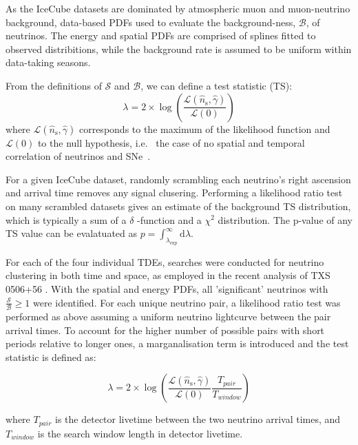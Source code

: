 \documentclass[twocolumn, tighten, linenumbers]{aastex62}
\begin{document}
As the IceCube datasets are dominated by atmospheric muon and muon-neutrino background, data-based PDFs used to evaluate the background-ness, $\mathcal{B}$,  of neutrinos. The energy and spatial PDFs are comprised of splines fitted to observed distribitions, while the background rate is assumed to be uniform within data-taking seasons.

From the definitions of $\mathcal{S}$ and $\mathcal{B}$, we can define a test statistic (TS):
\begin{equation*}
\lambda = 2\times \log \left( \frac{\mathcal{L}(\hat{n}_\text{s}, \hat{\gamma})}{\mathcal{L}(0)} \right)
\end{equation*}
where $\mathcal{L}(\hat{n}_\text{s}, \hat{\gamma})$ corresponds to the maximum of the likelihood function and $\mathcal{L}(0)$ to the null hypothesis, i.e.~ the case of no spatial and temporal correlation of neutrinos and SNe~\citep{Braun:2008bg,Braun:2009aa}. 

For a given IceCube dataset, randomly scrambling each neutrino's right ascension and arrival time removes any signal clusering. Performing a likelihood ratio test on many scrambled datasets gives an estimate of the background TS distribution, which is typically a sum of a $\delta $ -function and a $\chi^{2}$ distribution. The p-value of any TS value can be evalatuated as $p = \int_{\lambda_\text{exp}}^\infty \mathrm{d}\lambda$.

For each of the four individual TDEs, searches were conducted for neutrino clustering in both time and space, as employed in the recent analysis of TXS 0506+56 \cite{txsps}. With the spatial and energy PDFs, all 'significant' neutrinos with $\frac{\mathcal{S}}{\mathcal{B}} \geq 1$ were identified. For each unique neutrino pair, a likelihood ratio test was performed as above assuming a uniform neutrino lightcurve between the pair arrival times. To account for the higher number of possible pairs with short periods relative to longer ones, a marganalisation term is introduced and the test statistic is defined as:

\begin{equation*}
\lambda = 2\times \log \left( \frac{\mathcal{L}(\hat{n}_\text{s}, \hat{\gamma})}{\mathcal{L}(0)} \frac{T_{pair}}{T_{window}}\right)
\end{equation*}

where $T_{pair}$ is the detector livetime between the two neutrino arrival times, and $T_{window}$ is the search window length in detector livetime.
\end{document}
